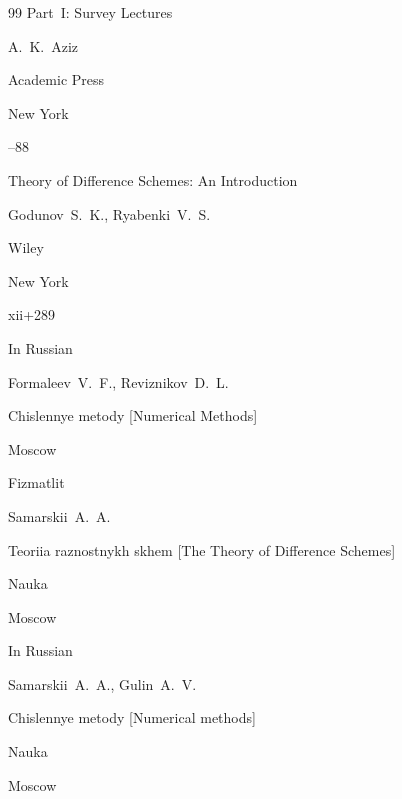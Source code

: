 \begin{thebibliography}{99}
\bookinfo Part~I: Survey Lectures

\ed A.~K.~Aziz

\publ Academic Press

\publaddr New York


--88







\book Theory of Difference Schemes: An Introduction

\by Godunov~S.~K., Ryabenki~V.~S.

\publ Wiley

\publaddr New York


\totalpages xii+289 




\lang In Russian

\by Formaleev~V.~F., Reviznikov~D.~L.

\book Chislennye metody \rm  [Numerical Methods]

\publaddr Moscow

\publ Fizmatlit










\by Samarskii~A.~A.

\book Teoriia raznostnykh skhem \rm  [The Theory of Difference Schemes]

\publ Nauka

\publaddr Moscow


\lang In Russian





\by Samarskii~A.~A., Gulin~A.~V.

\book Chislennye metody \rm [Numerical methods]

\publ Nauka

\publaddr Moscow



\end{thebibliography}
